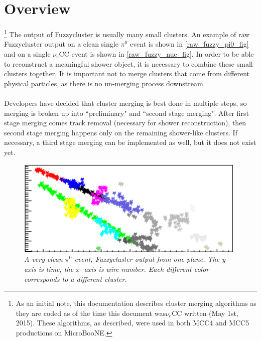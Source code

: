 \documentclass{article}
\title{\myTitle}
\author{\myAuthorName}
\date{\today}
\begin{document}
\maketitle

\section{Overview}
\footnote{As an initial note, this documentation describes cluster merging algorithms as they are coded as of the time this document was$\nu_e$CC written (May 1st, 2015). These algorithms, as described, were used in both MCC4 and MCC5 productions on MicroBooNE.} The output of Fuzzycluster is usually many small clusters. An example of raw Fuzzycluster output on a clean single $\pi^0$ event is shown in \autoref{raw_fuzzy_pi0_fig} and on a single $\nu_e$CC event is shown in \autoref{raw_fuzzy_nue_fig}. In order to be able to reconstruct a meaningful shower object, it is necessary to combine these small clusters together. It is important not to merge clusters that come from different physical particles, as there is no un-merging process downstream. \\\\
\indent Developers have decided that cluster merging is best done in multiple steps, so merging is broken up into ``preliminary" and ``second stage merging". After first stage merging comes track removal (necessary for shower reconstruction), then second stage merging happens only on the remaining shower-like clusters. If necessary, a third stage merging can be implemented as well, but it does not exist yet.

\begin{figure}[h!]
\begin{center}
\includegraphics[width=110mm]{Figures/raw_fuzzy_pi0.png}
\end{center}
\caption{\textit{A very clean $\pi^0$ event, Fuzzycluster output from one plane. The y- axis is time, the x- axis is wire number. Each different color corresponds to a different cluster.}}
\label{raw_fuzzy_pi0_fig}
\end{figure}
\end{document}
